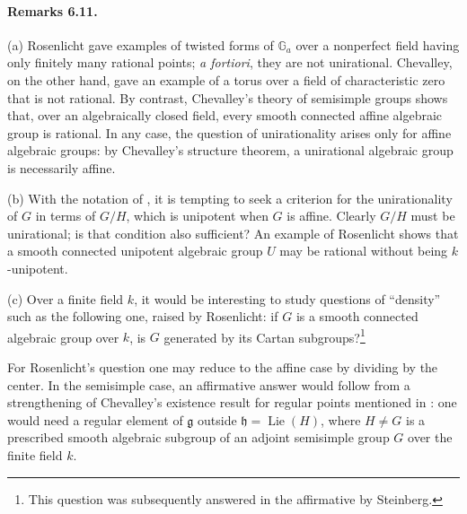 
\paragraph{\textbf{Remarks 6.11.}}
\textup{(a)} Rosenlicht gave examples of twisted forms of
\(\mathbb G_a\) over a nonperfect field having only finitely many
rational points; \emph{a fortiori}, they are not unirational.
Chevalley, on the other hand, gave an example of a torus over a
field of characteristic zero that is not rational. By contrast,
Chevalley's theory of semisimple groups shows that, over an
algebraically closed field, every smooth connected affine
algebraic group is rational. In any case, the question of
unirationality arises only for affine algebraic groups: by
Chevalley's structure theorem, a unirational algebraic group is
necessarily affine.

\textup{(b)} With the notation of , it is tempting to seek a
criterion for the unirationality of \(G\) in terms of \(G/H\),
which is unipotent when \(G\) is affine. Clearly \(G/H\) must be
unirational; is that condition also sufficient? An example of
Rosenlicht shows that a smooth connected unipotent algebraic
group \(U\) may be rational without being \(k\)-unipotent.

\textup{(c)} Over a finite field \(k\), it would be interesting
to study questions of ``density'' such as the following one,
raised by Rosenlicht: if \(G\) is a smooth connected algebraic
group over \(k\), is \(G\) generated by its Cartan
subgroups?\footnote{This question was subsequently answered in
the affirmative by Steinberg.}

For Rosenlicht's question one may reduce to the affine case by
dividing by the center. In the semisimple case, an affirmative
answer would follow from a strengthening of Chevalley's
existence result for regular points mentioned in : one would
need a regular element of \(\mathfrak g\) outside
\(\mathfrak h=\operatorname{Lie}(H)\), where \(H\ne G\) is a
prescribed smooth algebraic subgroup of an adjoint semisimple
group \(G\) over the finite field \(k\).

